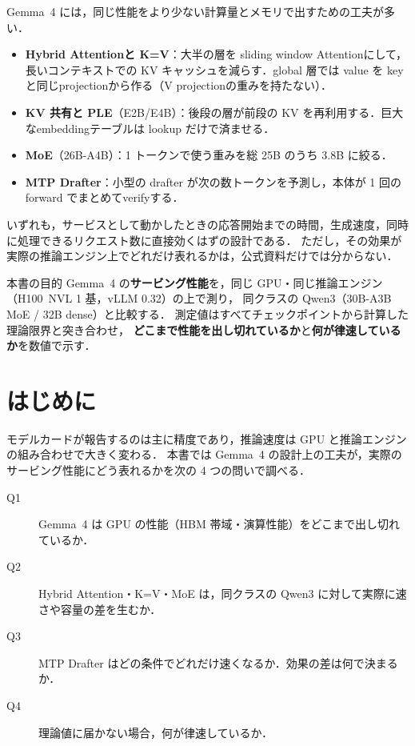 \documentclass[a4paper,10pt]{ltjsarticle}
\begin{document}
Gemma~4 には，同じ性能をより少ない計算量とメモリで出すための工夫が多い．
\begin{itemize}
\item \textbf{Hybrid Attentionと K=V}：大半の層を sliding window Attentionにして，長いコンテキストでの KV キャッシュを減らす．global 層では value を key と同じprojectionから作る（V projectionの重みを持たない）．
\item \textbf{KV 共有と PLE}（E2B/E4B）：後段の層が前段の KV を再利用する．巨大なembeddingテーブルは lookup だけで済ませる．
\item \textbf{MoE}（26B-A4B）：1 トークンで使う重みを総 25B のうち 3.8B に絞る．
\item \textbf{MTP Drafter}：小型の drafter が次の数トークンを予測し，本体が 1 回の forward でまとめてverifyする．
\end{itemize}
いずれも，サービスとして動かしたときの応答開始までの時間，生成速度，同時に処理できるリクエスト数に直接効くはずの設計である．
ただし，その効果が実際の推論エンジン上でどれだけ表れるかは，公式資料だけでは分からない．

\begin{keybox}{本書の目的}
Gemma~4 の\textbf{サービング性能}を，同じ GPU・同じ推論エンジン（H100~NVL 1 基，vLLM 0.32）の上で測り，
同クラスの Qwen3（30B-A3B MoE / 32B dense）と比較する．
測定値はすべてチェックポイントから計算した理論限界と突き合わせ，
\textbf{どこまで性能を出し切れているか}と\textbf{何が律速しているか}を数値で示す．
\end{keybox}

\section{はじめに}
モデルカードが報告するのは主に精度であり，推論速度は GPU と推論エンジンの組み合わせで大きく変わる．
本書では Gemma~4 の設計上の工夫が，実際のサービング性能にどう表れるかを次の 4 つの問いで調べる．
\begin{description}
\item[Q1] Gemma~4 は GPU の性能（HBM 帯域・演算性能）をどこまで出し切れているか．
\item[Q2] Hybrid Attention・K=V・MoE は，同クラスの Qwen3 に対して実際に速さや容量の差を生むか．
\item[Q3] MTP Drafter はどの条件でどれだけ速くなるか．効果の差は何で決まるか．
\item[Q4] 理論値に届かない場合，何が律速しているか．
\end{description}
\end{document}
